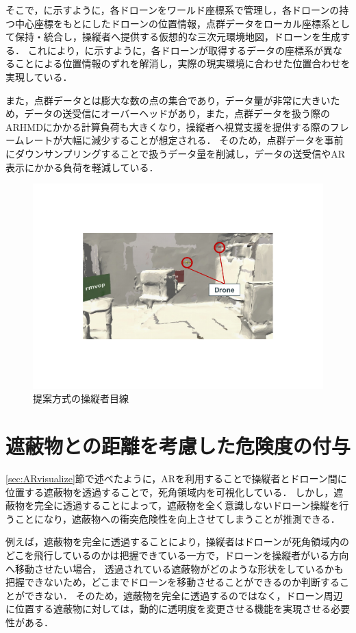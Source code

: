 \documentclass[a4paper,11pt]{ujreport}
\begin{document}
そこで，に示すように，各ドローンをワールド座標系で管理し，各ドローンの持つ中心座標をもとにしたドローンの位置情報，点群データをローカル座標系として保持・統合し，操縦者へ提供する仮想的な三次元環境地図，ドローンを生成する．
これにより，に示すように，各ドローンが取得するデータの座標系が異なることによる位置情報のずれを解消し，実際の現実環境に合わせた位置合わせを実現している．

また，点群データとは膨大な数の点の集合であり，データ量が非常に大きいため，データの送受信にオーバーヘッドがあり，また，点群データを扱う際のARHMDにかかる計算負荷も大きくなり，操縦者へ視覚支援を提供する際のフレームレートが大幅に減少することが想定される．
そのため，点群データを事前にダウンサンプリングすることで扱うデータ量を削減し，データの送受信やAR表示にかかる負荷を軽減している．


\begin{figure}[!tb]
  \centering
  \includegraphics[width=\linewidth]{img/03_propose.pdf}
  \caption{提案方式の操縦者目線}
  \label{fig:03_propose}
\end{figure}


\section{遮蔽物との距離を考慮した危険度の付与}
\label{sec:DangerLevel}

\ref{sec:ARvisualize}節で述べたように，ARを利用することで操縦者とドローン間に位置する遮蔽物を透過することで，死角領域内を可視化している．
しかし，遮蔽物を完全に透過することによって，遮蔽物を全く意識しないドローン操縦を行うことになり，遮蔽物への衝突危険性を向上させてしまうことが推測できる．
\par
例えば，遮蔽物を完全に透過することにより，操縦者はドローンが死角領域内のどこを飛行しているのかは把握できている一方で，ドローンを操縦者がいる方向へ移動させたい場合，
透過されている遮蔽物がどのような形状をしているかも把握できないため，どこまでドローンを移動させることができるのか判断することができない．
そのため，遮蔽物を完全に透過するのではなく，ドローン周辺に位置する遮蔽物に対しては，動的に透明度を変更させる機能を実現させる必要性がある．
\end{document}

